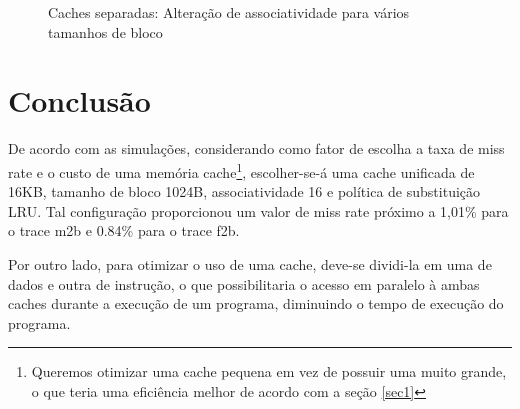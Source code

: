 \documentclass[10pt,a4paper]{article}
\begin{document}
\begin{figure}[h!]
\caption{Caches separadas:  Alteração de associatividade para vários tamanhos de bloco}
\end{figure}

\section{Conclusão}
De acordo com as simulações, considerando como fator de
escolha a taxa de miss rate e o custo de uma memória
cache\footnote{Queremos otimizar uma cache pequena em vez de possuir
  uma muito grande, o que teria uma eficiência melhor de acordo com a
seção \ref{sec1}}, escolher-se-á uma cache unificada de 16KB, tamanho
de bloco 1024B, associatividade 16 e política de substituição LRU.
Tal configuração proporcionou um valor de miss rate próximo a 1,01\% para o
trace m2b e 0.84\% para o trace f2b.

Por outro lado, para otimizar o uso de uma cache, deve-se dividi-la em
uma de dados e outra de instrução, o que possibilitaria o acesso em
paralelo à ambas caches durante a execução de um programa, diminuindo
o tempo de execução do programa.
\end{document}
